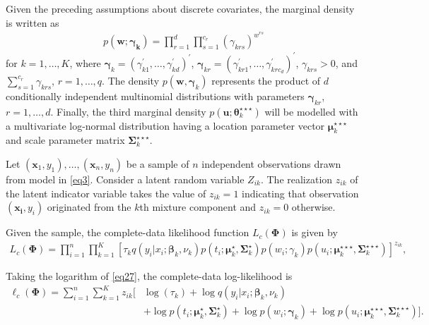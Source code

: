 \documentclass[12pt,letterpaper]{article}
\numberwithin{equation}{section}
\numberwithin{equation}{section}
\numberwithin{equation}{section}
\begin{document}
Given the preceding assumptions about discrete covariates, the marginal density is written as
\begin{align}
p(\bm {w}; \bm {\gamma_k})=\prod_{r=1}^{d}\prod_{s=1}^{c_r}(\gamma_{krs} )^{w^{rs}}
\label{eq31}
\end{align}
for $k=1, \ldots, K$, where $\bm {\gamma}_k=(\gamma_{k1}^{'}, \ldots, \gamma_{kd}^{'})^{'}$, $\bm \gamma_{kr}=(\gamma_{kr1}^{'}, \ldots, \gamma_{krc_d}^{'})^{'}$, $\gamma_{krs} > 0$, and  $\sum_{s=1}^{c_r}\gamma_{krs}$, $r=1,\ldots,q$. The density $p(\bm {w}, \bm{\gamma}_k)$ represents the product of $d$ conditionally independent multinomial distributions with parameters $\bm{\gamma}_{kr}$, $r=1,\ldots, d$. Finally, the third marginal density $p(\bm{u};\bm{\theta}_{k}^{\star\star\star})$ will be modelled with a multivariate log-normal distribution having a location parameter vector $ \bm{\mu}_k^{\star\star\star}$ and scale parameter matrix $\bm{\Sigma}_k^{\star\star\star} $.

Let $(\bm x_1, y_1),\ldots, (\bm x_n, y_n)$ be a sample of $n$ independent observations drawn from model in \eqref{eq3}. Consider a latent random variable $Z_{ik}$.  The realization $z_{ik}$ of the latent indicator variable takes the value of $z_{ik}=1$ indicating that observation $(\bm{x_i}, y_i)$ originated from the $k$th mixture component and $z_{ik}=0$ otherwise.


 Given the sample, the complete-data likelihood function $L_c(\bm\Phi)$ is given by
\begin{align}
L_c(\bm\Phi)=\prod_{i=1}^{n}\prod_{k=1}^{K}\left[{\tau_k}q(y_i|x_i; \bm \beta_k, \nu_{k})p(t_i; \bm\mu_k^{\star}, \bm\Sigma_k^{\star}) p(w_i; \gamma_k)p(u_i; \bm{\mu}_k^{\star\star\star},\bm{\Sigma}_k^{\star\star\star}) \right]^{z_{ik}},
\label{eq27}
\end{align}

%
Taking the logarithm of \eqref{eq27}, the complete-data log-likelihood is 
\begin{align}
\ell_c(\bm\Phi)= \sum_{i=1}^{n}\sum_{k=1}^{K}{z_{ik}}\big[&\log(\tau_{k}) + \log{q}(y_i|x_i; \bm{\beta}_k,\nu_k)\nonumber\\&+  \log p(t_i; \bm{\mu}_k^{\star}, \bm{\Sigma}_k^{\star}) + \log p(w_i; \bm{\gamma}_k) +\log {p}(u_i; \bm{\mu}_k^{\star\star\star},\bm{\Sigma}_k^{\star\star\star}) \big].\label{CompleteLiklihood}
\end{align}
\end{document}
